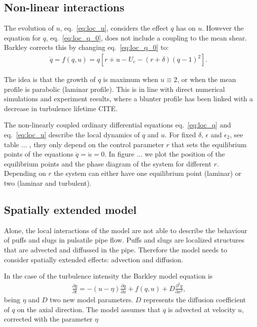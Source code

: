 \documentclass{article}
\begin{document}
\subsection{Non-linear interactions}
The evolution of $u$, eq.~\ref{eq:loc_u}, considers the effect $q$ has on $u$. However the equation for $q$, eq.~\ref{eq:loc_q_0}, does not include a coupling to the mean shear. Barkley corrects this by changing eq.~\ref{eq:loc_q_0} to: 
\begin{align}
\dot{q}=f\left(q,u\right)=q \left[r+u-U_{c}-\left(r+\delta \right) \left(q -1 \right)^{2} \right]\text{.}
\label{eq:loc_q}
\end{align}

The idea is that the growth of $q$ is maximum when $u \equiv  2$, or when the mean profile is parabolic (laminar profile). This is in line with direct numerical simulations and experiment results, where a blunter profile has been linked with a decrease in turbulence lifetime CITE.

The non-linearly coupled ordinary differential equations eq.~\ref{eq:loc_q} and eq.~\ref{eq:loc_u} describe the local dynamics of $q$ and $u$. For fixed $\delta$, $\epsilon$ and $\epsilon_{2}$, see table ... , they only depend on the control parameter $r$ that sets the equilibrium points of the equations $\dot{q}=\dot{u}=0$. In figure ... we plot the position of the equilibrium points and the phase diagram of the system for different $r$. Depending on $r$ the system can either have one equilibrium point (laminar) or two (laminar and turbulent).



\subsection{Spatially extended model}
Alone, the local interactions of the model are not able to describe the behaviour of puffs and slugs in pulsatile pipe flow. Puffs and slugs are localized structures that are advected and diffussed in the pipe. Therefore the model needs to consider spatially extended effects: advection and diffusion. 

In the case of the turbulence intensity the Barkley model equation is
\begin{align}
\frac{\partial q}{\partial t}=-\left(u-\eta \right)\frac{\partial q}{\partial x} + f\left(q,u \right) + D\frac{\partial^{2} q}{\partial x^{2}} \text{,}
\label{eq:PDE_q}
\end{align}
being $\eta$ and $D$ two new model parameters. $D$ represents the diffusion coefficient of $q$ on the axial direction. The model assumes that $q$ is advected at velocity $u$, corrected with the parameter $\eta$
\end{document}
